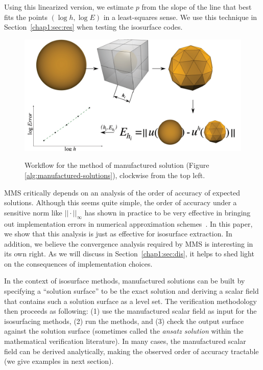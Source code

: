 Using this linearized version, we estimate $p$ from the slope of 
the line that best fits the points $(\log h,\log E)$ in a
least-squares sense. We use this technique in Section~\ref{chap1:sec:res}
when testing the isosurface codes.

\begin{figure}[t]
\centering
\includegraphics[width=0.95\linewidth,keepaspectratio=true]{chapter2/figures/mms.pdf}
\label{fig:mms-flow}
\caption{Workflow for the method of manufactured solution (Figure \ref{alg:manufactured-solutions}), clockwise from the top left.}
\end{figure}

MMS critically depends on an analysis of the order of accuracy of
expected solutions. Although this seems quite simple, the order of
accuracy under a sensitive norm like $||\cdot||_\infty$ has shown in
practice to be very effective in bringing out implementation errors in
numerical approximation schemes~\cite{Roy2005,babuska04}. In this
paper, we show that this analysis is just as effective for isosurface
extraction. In addition, we believe the convergence analysis required
by MMS is interesting in its own right. As we will discuss in
Section~\ref{chap1:sec:dis}, it helps to shed light on the consequences of
implementation choices.

In the context of isosurface methods, manufactured solutions can be built by
specifying a ``solution surface'' to be the exact solution and deriving a 
scalar field that contains such a solution surface as a level set. The 
verification methodology then proceeds as following: 
(1) use the manufactured scalar field as input for the isosurfacing 
methods, (2) run the methods, and (3) check the output surface against 
the solution surface (sometimes called the {\em ansatz solution} within
the mathematical verification literature).
In many cases, the manufactured scalar field can be derived analytically, 
making the observed order of accuracy tractable (we give
examples in next section).


